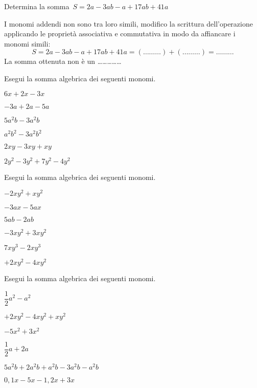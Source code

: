 \begin{esercizio}
 \label{ese:9.25}
Determina la somma~$S=2a-3ab-a+17ab+41a$

I monomi addendi non sono tra loro simili, modifico la scrittura
dell'operazione applicando le proprietà associativa e commutativa
in modo da affiancare i monomi simili:
\[
S=2a-3ab-a+17ab+41a=(\ldots\ldots\ldots)+(\ldots\ldots\ldots)=\ldots\ldots\ldots
\]
La somma ottenuta non è un \ldots\ldots\ldots\ldots\ldots
\end{esercizio}

\begin{esercizio}
 \label{ese:9.26}
Esegui la somma algebrica dei seguenti monomi.
\begin{multicols}{3}
\begin{enumeratea}
 \item $6x+2x-3x$
 \item $-3a+2a-5a$
 \item $5a^{2}b-3a^{2}b$
 \item $a^{2}b^{2}-3a^{2}b^{2}$
 \item $2xy-3xy+xy$
 \item $2y^{2}-3y^{2}+7y^{2}-4y^{2}$
\end{enumeratea}
\end{multicols}
\end{esercizio}

\begin{esercizio}
 \label{ese:9.27}
Esegui la somma algebrica dei seguenti monomi.
\begin{multicols}{3}
\begin{enumeratea}
 \item $-2xy^{2}+xy^{2}$
 \item $-3ax-5ax$
 \item $5ab-2ab$
 \item $-3xy^{2}+3xy^{2}$
 \item $7xy^{3}-2xy^{3}$
 \item $+2xy^{2}-4xy^{2}$
\end{enumeratea}
\end{multicols}
\end{esercizio}

\begin{esercizio}
 \label{ese:9.28}
Esegui la somma algebrica dei seguenti monomi.
\begin{multicols}{2}
\begin{enumeratea}
 \item $\dfrac{1}{2}a^{2}-a^{2}$
 \item $+2xy^{2}-4xy^{2}+xy^{2}$
 \item $-5x^{2}+3x^{2}$
 \item $\dfrac{1}{2}a+2a$
 \item $5a^{2}b+2a^{2}b+a^{2}b-3a^{2}b-a^{2}b$
 \item $0,1x-5x-1,2x+3x$
\end{enumeratea}
\end{multicols}
\end{esercizio}

